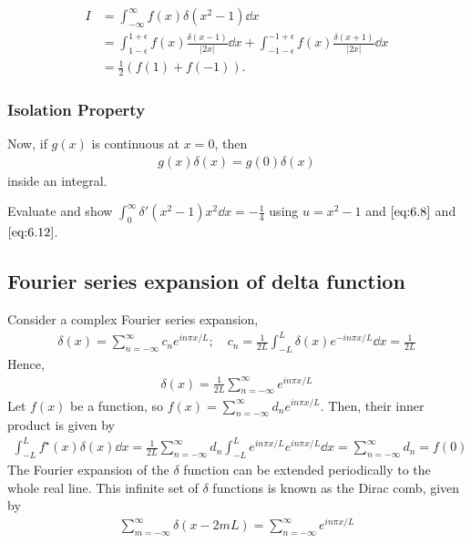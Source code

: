\begin{example}
	\begin{align*}
		I &= \int_{-\infty}^{\infty} f(x) \delta(x^2 - 1) \dd{x} \\
		&= \int_{1 - \epsilon}^{1 + \epsilon} f(x) \frac{\delta(x - 1)}{|2x|} \dd{x} + \int_{-1 - \epsilon}^{-1 + \epsilon} f(x) \frac{\delta(x + 1)}{|2x|} \dd{x} \\
		&= \frac{1}{2} (f(1) + f(-1)).
	\end{align*} 
\end{example} 

\subsubsection{Isolation Property}
Now, if $g(x)$ is continuous at $x = 0$, then 
\begin{align*}
	g(x) \delta(x) = g(0) \delta(x) \label{eq:6.13}
\end{align*} 
inside an integral.

\begin{exercise}
	Evaluate and show $\int_{0}^{\infty} \delta'(x^2 - 1) x^2 \dd{x} = - \frac{1}{4}$ using $u = x^2 - 1$ and $\cref{eq:6.8}$ and $\cref{eq:6.12}$.
\end{exercise} 

\subsection{Fourier series expansion of delta function}
Consider a complex Fourier series expansion,
\begin{align*}
	\delta(x) = \sum_{n=-\infty}^\infty c_n e^{in\pi x/L};\quad c_n = \frac{1}{2L}\int_{-L}^L \delta(x) e^{-i n \pi x / L} \dd{x} = \frac{1}{2L}
\end{align*}
Hence,
\begin{align*}
	\delta(x) = \frac{1}{2L} \sum_{n=-\infty}^\infty e^{in\pi x/L}
\end{align*}
Let $f(x)$ be a function, so $f(x) = \sum_{n=-\infty}^\infty d_n e^{in \pi x / L}$.
Then, their inner product is given by
\begin{align*}
	\int_{-L}^L f^\star(x) \delta(x) \dd{x} = \frac{1}{2L} \sum_{n = -\infty}^\infty d_n \int_{-L}^L e^{in \pi x/L} e^{in \pi x/L} \dd{x} = \sum_{n = -\infty}^\infty d_n = f(0)
\end{align*}
The Fourier expansion of the $\delta$ function can be extended periodically to the whole real line.
This infinite set of $\delta$ functions is known as the Dirac comb, given by
\begin{align*}
	\sum_{m = -\infty}^\infty \delta(x-2mL) = \sum_{n = -\infty}^\infty e^{in \pi x/L}
\end{align*}


